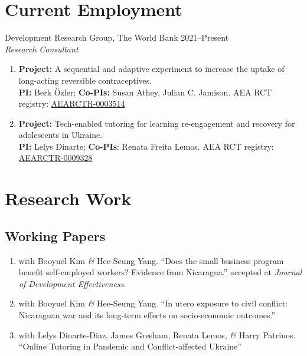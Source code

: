\documentclass[a4paper, 10pt]{article}
\renewenvironment{itemize}{
  \begin{list}{}
    { \setlength{\itemsep}{5pt}
      \setlength{\parsep}{0pt}
      \setlength{\topsep}{0pt}
      \setlength{\leftmargin}{0em} } }{
  \end{list}}
\begin{document}
\section*{Current Employment}
\begin{itemize}
\item Development Research Group, The World Bank \hfill 2021--Present \\
{\small \textit{Research Consultant} }
  \begin{enumerate}[leftmargin=10pt, label={}, nosep]
    \item {\small \textbf{Project:} A sequential and adaptive experiment to increase the uptake of long-acting reversible contraceptives.} \\ {\small \textbf{PI:} Berk Özler; \textbf{Co-PIs:} Susan Athey, Julian C. Jamison.} {\small AEA RCT registry: \href{https://www.socialscienceregistry.org/trials/3514}{AEARCTR-0003514}}
    \item {\small \textbf{Project:} Tech-enabled tutoring for learning re-engagement and recovery for adolescents in Ukraine.} \\ {\small \textbf{PI:} Lelys Dinarte; \textbf{Co-PIs}: Renata Freita Lemos.} {\small AEA RCT registry: \href{https://www.socialscienceregistry.org/trials/9328}{AEARCTR-0009328}}
  \end{enumerate}  
\end{itemize}





\section*{Research Work}

\subsection*{Working Papers}

\begin{enumerate}[leftmargin=10pt, label={}, itemindent=-10pt, nosep]
\item with Booyuel Kim \textit{\&} Hee-Seung Yang. ``Does the small business
program benefit self-employed workers? Evidence from Nicaragua.'' accepted
at \textit{Journal of Development Effectiveness}.
\item with Booyuel Kim \textit{\&} Hee-Seung Yang. ``In utero exposure to civil conflict: Nicaraguan war and its long-term effects on socio-economic outcomes.''
\item with Lelys Dinarte-Diaz, James Gresham, Renata Lemos, \textit{\&} Harry
Patrinos. ``Online Tutoring in Pandemic and Conflict-affected Ukraine''
\end{enumerate}
\end{document}
